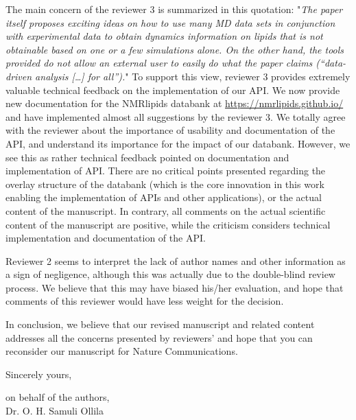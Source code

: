 \documentclass[11pt]{letter}
\begin{document}
The main concern of the reviewer 3 is summarized in this quotation: "\textit{The paper itself proposes exciting ideas on how to use many MD data sets in conjunction with experimental data to obtain dynamics information on lipids that is not obtainable based on one or a few simulations alone. On the other hand, the tools provided do not allow an external user to easily do what the paper claims (“data-driven analysis […] for all”).}" To support this view, reviewer 3 provides extremely valuable technical feedback on the implementation of our API. We now provide new documentation for the NMRlipids databank at \url{https://nmrlipids.github.io/} and have implemented almost all suggestions by the reviewer 3. We totally agree with the reviewer about the importance of usability and documentation of the API, and understand its importance for the impact of our databank. However, we see this as rather technical feedback pointed on documentation and implementation of API. There are no critical points presented regarding the overlay structure of the databank (which is the core innovation in this work enabling the implementation of APIs and other applications), or the actual content of the manuscript. In contrary, all comments on the actual scientific content of the manuscript are positive, while the criticism considers technical implementation and documentation of the API. 

Reviewer 2 seems to interpret the lack of author names and other information as a sign of negligence, although this was actually due to the double-blind review process. We believe that this may have biased his/her evaluation, and hope that comments of this reviewer would have less weight for the decision. 

In conclusion, we believe that our revised manuscript and related content addresses all the concerns presented by reviewers' and hope that you can reconsider our manuscript for Nature Communications.

Sincerely yours,

on behalf of the authors,\\

Dr. O. H. Samuli Ollila
\end{document}
